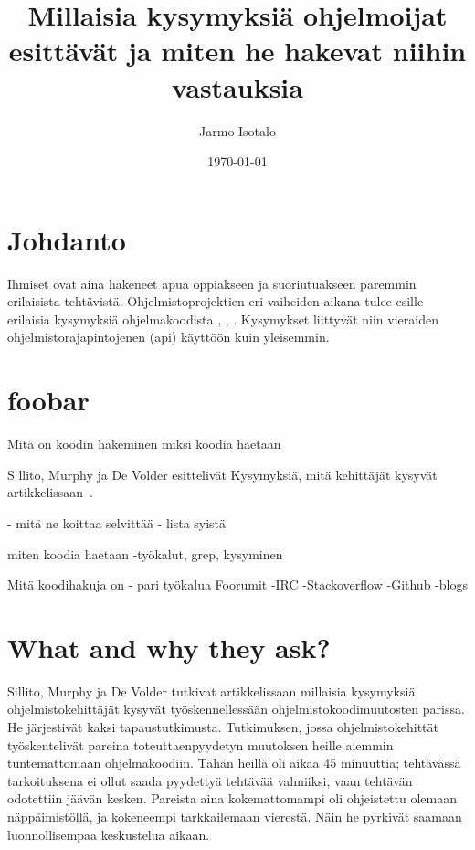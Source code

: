 \documentclass[finnish]{../tktltiki2}
\title{Millaisia kysymyksiä ohjelmoijat esittävät ja miten he hakevat niihin vastauksia}
\author{Jarmo Isotalo}
\date{\today}
\theoremstyle{definition}
\theoremstyle{remark}
\begin{document}

\frontmatter      %

\maketitle        %

\tableofcontents  %


\mainmatter       %

\section{Johdanto}
Ihmiset ovat aina hakeneet apua oppiakseen ja suoriutuakseen paremmin erilaisista tehtävistä. %
Ohjelmistoprojektien eri vaiheiden aikana tulee esille erilaisia kysymyksiä ohjelmakoodista \cite{g_search_code}, \cite{questions-during-software-evolution-tasks}, \cite{asking-and-answering-api-questions}.
Kysymykset liittyvät niin vieraiden ohjelmistorajapintojenen (api) käyttöön \cite{jungloid-mining} kuin yleisemmin.

\section{foobar}
Mitä on koodin hakeminen
miksi koodia haetaan

S
llito, Murphy ja De Volder esittelivät Kysymyksiä, mitä kehittäjät kysyvät artikkelissaan~\cite{questions-during-software-evolution-tasks}.

- mitä ne koittaa selvittää
  - lista syistä

miten koodia haetaan
-työkalut, grep, kysyminen

Mitä koodihakuja on
- pari työkalua
Foorumit
-IRC
-Stackoverflow
-Github
-blogs

\section{What and why they ask?}
Sillito, Murphy ja De Volder tutkivat artikkelissaan \cite{questions-during-software-evolution-tasks} millaisia kysymyksiä ohjelmistokehittäjät kysyvät työskennellessään ohjelmistokoodimuutosten parissa.
He järjestivät kaksi tapaustutkimusta. Tutkimuksen, jossa ohjelmistokehittät työskentelivät pareina toteuttaenpyydetyn muutoksen heille aiemmin tuntemattomaan ohjelmakoodiin. Tähän heillä oli aikaa 45 minuuttia; tehtävässä tarkoituksena ei ollut saada pyydettyä tehtävää valmiiksi, vaan tehtävän odotettiin jäävän kesken. Pareista aina kokemattomampi oli ohjeistettu olemaan näppäimistöllä, ja kokeneempi tarkkailemaan vierestä. Näin he pyrkivät saamaan luonnollisempaa keskustelua aikaan.
\end{document}
